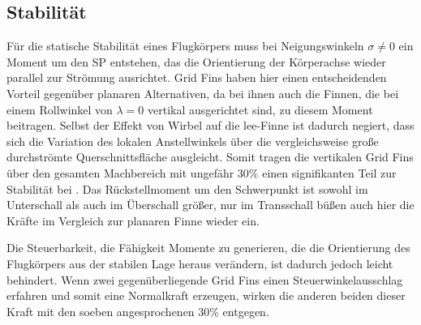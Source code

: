 \subsection{Stabilität}
Für die statische Stabilität eines Flugkörpers muss bei Neigungswinkeln $\sigma \neq 0$ ein Moment um den \gls{SP} entstehen, das die Orientierung der Körperachse wieder parallel zur Strömung ausrichtet. Grid Fins haben hier einen entscheidenden Vorteil gegenüber planaren Alternativen, da bei ihnen auch die Finnen, die bei einem Rollwinkel von $\lambda = 0$ vertikal ausgerichtet sind, zu diesem Moment beitragen. Selbst der Effekt von Wirbel auf die lee-Finne ist dadurch negiert, dass sich die Variation des lokalen Anstellwinkels über die vergleichsweise große durchströmte Querschnittsfläche ausgleicht. Somit tragen die vertikalen Grid Fins über den gesamten Machbereich mit ungefähr 30\% einen signifikanten Teil zur Stabilität bei \cite{vergleichPlanarNATO}. Das Rückstellmoment um den Schwerpunkt ist sowohl im Unterschall als auch im Überschall größer, nur im Transschall büßen auch hier die Kräfte im Vergleich zur planaren Finne wieder ein.

Die Steuerbarkeit, die Fähigkeit Momente zu generieren, die die Orientierung des Flugkörpers aus der stabilen Lage heraus verändern, ist dadurch jedoch leicht behindert. Wenn zwei gegenüberliegende Grid Fins einen Steuerwinkelausschlag erfahren und somit eine Normalkraft erzeugen, wirken die anderen beiden dieser Kraft mit den soeben angesprochenen 30\% entgegen.
